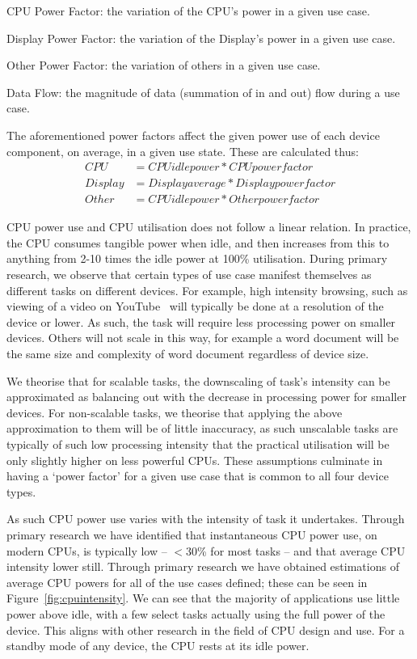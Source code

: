 \documentclass[conference]{IEEEtran}
\begin{document}
\begin{compactitem}
\item CPU Power Factor: the variation of the CPU’s power in a given use case.
\item Display Power Factor: the variation of the Display’s power in a given use case.
\item Other Power Factor: the variation of others in a given use case.
\item Data Flow: the magnitude of data (summation of in and out) flow during a use case.
\end{compactitem}

The aforementioned power factors affect the given power use of each
device component, on average, in a given use state. These are
calculated thus:
\begin{align*}
CPU &= CPU idle power * CPU power factor\\
Display &= Display average * Display power factor\\
Other &= CPU idle power * Other power factor
\end{align*}

CPU power use and CPU utilisation does not follow a linear
relation. In practice, the CPU consumes tangible power when idle, and
then increases from this to anything from 2-10 times the idle power at
100\% utilisation. During primary research, we observe that certain
types of use case manifest themselves as different tasks on different
devices. For example, high intensity browsing, such as viewing of a
video on YouTube~\cite{schien-et-al:2013} will typically be done at a
resolution of the device or lower. As such, the task will require less
processing power on smaller devices. Others will not scale in this
way, for example a word document will be the same size and complexity
of word document regardless of device size.

We theorise that for scalable tasks, the downscaling of task's
intensity can be approximated as balancing out with the decrease in
processing power for smaller devices. For non-scalable tasks, we
theorise that applying the above approximation to them will be of
little inaccuracy, as such unscalable tasks are typically of such low
processing intensity that the practical utilisation will be only
slightly higher on less powerful CPUs.  These assumptions culminate in
having a `power factor' for a given use case that is common to all
four device types.

As such CPU power use varies with the intensity of task it
undertakes. Through primary research we have identified that
instantaneous CPU power use, on modern CPUs, is typically low --
$<$30\% for most tasks -- and that average CPU intensity lower
still. Through primary research we have obtained estimations of
average CPU powers for all of the use cases defined; these can be seen
in Figure~\ref{fig:cpuintensity}. We can see that the majority of
applications use little power above idle, with a few select tasks
actually using the full power of the device. This aligns with other
research in the field of CPU design and use. For a standby mode of any
device, the CPU rests at its idle power.
\end{document}
